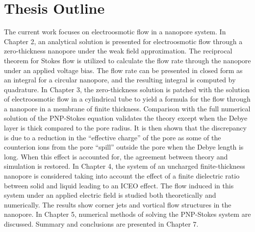 \section{Thesis Outline}
The current work focuses on electroosmotic flow in a nanopore system. In Chapter 2, an analytical solution is presented for electroosmotic flow through a zero-thickness nanopore under the weak field approximation. The reciprocal theorem for Stokes flow is utilized to calculate the flow rate through the nanopore under an applied voltage bias. The flow rate can be presented in closed form as an integral for a circular nanopore, and the resulting integral is computed by quadrature. In Chapter 3, the zero-thickness solution is patched with the solution of electroosmotic flow in a cylindrical tube to yield a formula for the flow 
through a nanopore in a membrane of finite thickness. Comparison with the full numerical solution of the PNP-Stokes 
equation validates the theory except when the Debye layer is thick compared to the pore radius. It is then shown that 
the discrepancy is due to a reduction in the ``effective charge'' of the pore as some of the counterion ions 
from the pore ``spill'' outside the pore when the Debye length is long. When this effect is accounted for, the 
agreement between theory and simulation is restored.
In Chapter 4, the system of an uncharged finite-thickness nanopore is considered taking into account the effect 
of a finite dielectric ratio between solid and liquid leading to an ICEO effect. The flow induced in this system under an applied electric field is studied both theoretically and numerically. The results show corner jets and vortical flow structures in the nanopore. In Chapter 5, numerical methods of solving the PNP-Stokes system are discussed. Summary and conclusions are presented in Chapter 7. 